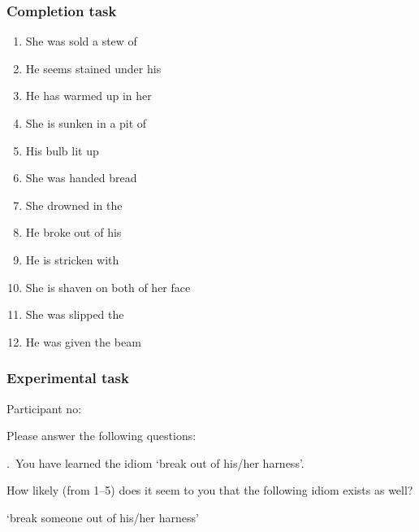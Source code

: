 \documentclass[output=paper]{langsci/langscibook}
\begin{document}
\subsubsection*{Completion task}
    \begin{enumerate}[nosep]
        \item She was sold a stew of \underline{\hphantom{3em}}
        \item He seems stained under his  \underline{\hphantom{3em}}
        \item He has warmed up in her  \underline{\hphantom{3em}}
        \item She is sunken in a pit of  \underline{\hphantom{3em}}
        \item His \underline{\hphantom{3em}} bulb lit up
        \item She was handed   \underline{\hphantom{3em}}  bread
        \item She drowned in the  \underline{\hphantom{3em}}   \underline{\hphantom{3em}}
        \item He  broke out of his  \underline{\hphantom{3em}}
        \item He is stricken with  \underline{\hphantom{3em}}
        \item She is shaven on both  \underline{\hphantom{3em}}  of her face
        \item She was slipped the \underline{\hphantom{3em}}
        \item He was given the \underline{\hphantom{3em}} beam
    \end{enumerate}

\subsubsection*{Experimental task}

\noindent Participant no: \underline{\hphantom{3em}}

\noindent Please answer the following questions:\vspace{.5\baselineskip}

.\ You have learned the idiom \enquote*{{break out of his/her harness}}.

\noindent How likely (from 1--5) does it seem to you that the following idiom
exists as well?\vspace{.5\baselineskip}

\noindent \enquote*{{break someone out of his/her harness}}\vspace{.5\baselineskip}
\end{document}
